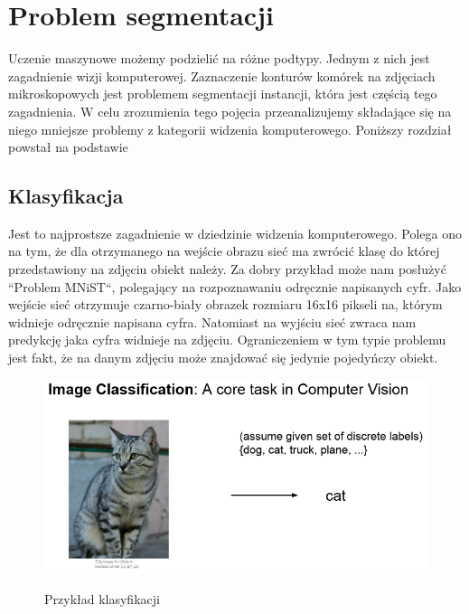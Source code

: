 \documentclass{article}
\begin{document}
\section{Problem segmentacji}
Uczenie maszynowe możemy podzielić na różne podtypy.
Jednym z nich jest zagadnienie wizji komputerowej.
Zaznaczenie konturów komórek na zdjęciach mikroskopowych jest problemem segmentacji instancji, która jest częścią tego zagadnienia.
W celu zrozumienia tego pojęcia przeanalizujemy składające się na niego mniejsze problemy z kategorii widzenia komputerowego.
Poniższy rozdział powstał na podstawie \cite{unet}
\subsection{Klasyfikacja}
Jest to najprostsze zagadnienie w dziedzinie widzenia komputerowego.
Polega ono na tym, że dla otrzymanego na wejście obrazu sieć ma zwrócić klasę do której przedstawiony na zdjęciu obiekt należy.
Za dobry przykład może nam posłużyć ``Problem MNiST``, polegający na rozpoznawaniu odręcznie napisanych cyfr.
Jako wejście sieć otrzymuje czarno-biały obrazek rozmiaru 16x16 pikseli na, którym widnieje odręcznie napisana cyfra.
Natomiast na wyjściu sieć zwraca nam predykcję jaka cyfra widnieje na zdjęciu.
Ograniczeniem w tym typie problemu jest fakt, że na danym zdjęciu może znajdować się jedynie pojedyńczy obiekt.
\begin{figure}[H]
    \centering
    \includegraphics[width=\linewidth]{images/klasyfikacja.png}
    \caption{Przykład klasyfikacji}
    \cite{unet}
    \label{fig:klasyfikacja}
\end{figure}
\end{document}
